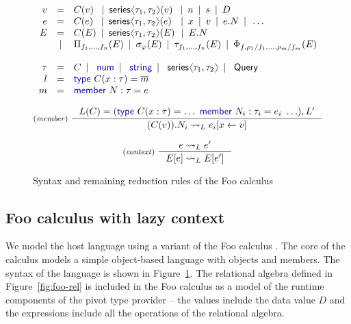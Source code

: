 \documentclass[a4paper,UKenglish]{lipics-v2016}
\theoremstyle{plain}
\theoremstyle{definition}
\newcommand{\langl}{\begin{picture}(4.5,7)
\put(1.1,2.5){\rotatebox{60}{\line(1,0){5.5}}}
\put(1.1,2.5){\rotatebox{300}{\line(1,0){5.5}}}
\end{picture}}
\newcommand{\rangl}{\begin{picture}(4.5,7)
\put(.9,2.5){\rotatebox{120}{\line(1,0){5.5}}}
\put(.9,2.5){\rotatebox{240}{\line(1,0){5.5}}}
\end{picture}}
\newcommand{\lsep}{~\,|\,~}
\newcommand{\kvd}[1]{\textnormal{\textcolor{kvdclr}{\sffamily #1}}}
\newcommand{\ident}[1]{\textnormal{\sffamily #1}}
\begin{document}
\begin{figure}
\vspace{-1em}
\begin{equation*}
\begin{array}{rcl}
  v &=& C(v)\,\, \lsep \ident{series}\langl \tau_1, \tau_2 \rangl(v)\; \lsep n \lsep s \lsep D \\
  e &=& C(e)\,\, \lsep \ident{series}\langl \tau_1, \tau_2 \rangl(e)\;\, \lsep x \lsep v \lsep e.N \lsep \ldots\\
  E &=& C(E) \lsep \ident{series}\langl \tau_1, \tau_2 \rangl(E)\, \lsep E.N \\
    &|& \Pi_{f_1, \ldots, f_n}(E) \lsep \sigma_\varphi(E) \lsep \tau_{f_1, \ldots, f_n}(E) \lsep \Phi_{f, \rho_1/f_1, \ldots, \rho_m/f_m} (E) \\
    \\
 \tau &=& C \lsep \kvd{num} \lsep \kvd{string} \lsep \ident{series}\langl \tau_1, \tau_2 \rangl \lsep \ident{Query}\\
 l &=& \kvd{type}~C(x:\tau) = \overline{m} \\
 m &=& \kvd{member}~N:\tau= e
\end{array}
\end{equation*}
\vspace{-1.85em}

\[
\inference[(\emph{member})~]
{ L(C) = (\kvd{type}~C(x:\tau)= \ldots~\kvd{member}~N_i : \tau_i = e_i~\ldots), L'}
{ (C(v)).N_i \leadsto_L e_i[x \leftarrow v] }\\
\]
\vspace{-3.15em}

\[
\inference[(\emph{context})~]
{e \leadsto_L e'}
{E[e] \leadsto_L E[e']}
\]
\caption{Syntax and remaining reduction rules of the Foo calculus}
\label{fig:foo-syntax}
\end{figure}


\subsection{Foo calculus with lazy context}
\label{sec:foo-foo}

We model the host language using a variant of the Foo calculus \cite{fsdata}. The core of the calculus models
a simple object-based language with objects and members. The syntax of the language is shown in
Figure~\ref{fig:foo-syntax}. The relational algebra defined in Figure~\ref{fig:foo-rel} is included
in the Foo calculus as a model of the runtime components of the pivot type provider -- the values
include the data value $D$ and the expressions include all the operations of the relational algebra.
\end{document}
